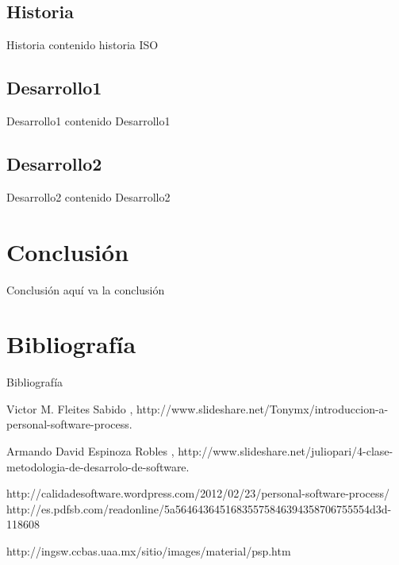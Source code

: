 \documentclass[]{beamer}
\begin{document}
		\subsection{Historia}
			\begin{frame}{Historia}
				contenido historia ISO
			\end{frame}
			
		\subsection{Desarrollo1}
			\begin{frame}{Desarrollo1}
				contenido Desarrollo1
			\end{frame}

		\subsection{Desarrollo2}
			\begin{frame}{Desarrollo2}
				contenido Desarrollo2
			\end{frame}
			
\section{Conclusi\'on}
	\begin{frame}{Conclusión}
		aqu\'i va la conclusi\'on
	\end{frame}				
			
\section{Bibliograf\'ia}
	\begin{frame}{Bibliograf\'ia}
		\begin{thebibliography}{9}
		
 			Victor M. Fleites Sabido 
 			, 
 			\newblock http://www.slideshare.net/Tonymx/introduccion-a-personal-software-process.
		
 			Armando David Espinoza Robles
 			, 
 			\newblock http://www.slideshare.net/juliopari/4-clase-metodologia-de-desarrolo-de-software.
 			
		http://calidadesoftware.wordpress.com/2012/02/23/personal-software-process/ 			
		http://es.pdfsb.com/readonline/5a56464364516835575846394358706755554d3d-118608
 			
 		http://ingsw.ccbas.uaa.mx/sitio/images/material/psp.htm
		\end{thebibliography}
	\end{frame}
\end{document}
